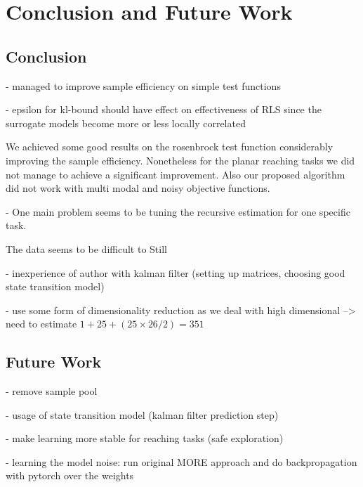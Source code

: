 
\chapter{Conclusion and Future Work}


\section{Conclusion}
- managed to improve sample efficiency on simple test functions

- epsilon for kl-bound should have effect on effectiveness of RLS
  since the surrogate models become more or less locally correlated

We achieved some good results on the rosenbrock test function
considerably improving the sample efficiency. Nonetheless for
the planar reaching tasks we did not manage to achieve a
significant improvement.
Also our proposed algorithm did not work with multi modal and noisy objective functions.

- One main problem seems to be tuning the recursive estimation for one specific
task.

The data seems to be difficult to Still

- inexperience of author with kalman filter (setting up matrices, choosing good state transition model)

- use some form of dimensionality reduction as we deal with
high dimensional --> need to estimate $1 + 25 + (25 \times 26 / 2) = 351$

\section{Future Work}
- remove sample pool

- usage of state transition model (kalman filter prediction step)

- make learning more stable for reaching tasks (safe exploration)

- learning the model noise: run original MORE approach and do backpropagation with pytorch over the
weights